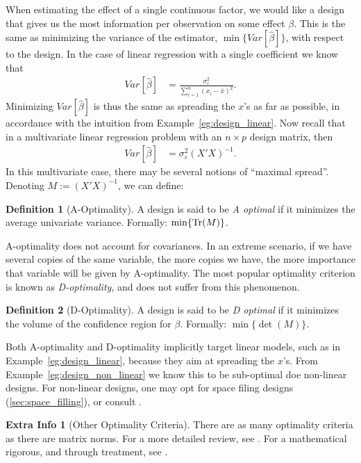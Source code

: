 \documentclass[12pt,a4paper]{report}
\theoremstyle{plain}
\theoremstyle{definition}
\newtheorem{definition}{Definition}
\newtheorem{extra}{Extra Info}
\newcommand{\set}[1]{\{ #1 \}} \newcommand{\setII}[1]{\left\{ #1 \right\}} \newcommand{\rv}[1]{\mathbf{#1}} \newcommand{\x}{\rv x} \newcommand{\y}{\rv y} \newcommand{\U}{\rv u} \newcommand{\T}{\rv t} \newcommand{\X}{\rv X} \newcommand{\Y}{\rv Y} \newcommand{\expect}[1]{\mathbf{E}\left[ #1 \right]} \newcommand{\expectg}[2]{\mathbf{E}_{\rv{#1}}\left[ \rv{#2} \right]} \newcommand{\expectn}[1]{\mathbb{E}\left[#1\right]} \newcommand{\cov}[1]{\mathbf{Cov} \left[ #1 \right]} \newcommand{\var}[1]{\mathop{Var} \left[ #1 \right]} \newcommand{\covn}[1]{\mathbb{Cov} \left[ #1 \right]} \newcommand{\gauss}[1]{\mathcal{N}\left(#1\right)} \newcommand{\cdf}[2]{F_{#1} (#2)} \newcommand{\survive}[2]{S_{#1} (#2)} \newcommand{\hazard}[2]{h_{#1} (#2)} \newcommand{\cuhazard}[2]{H_{#1} (#2)} \newcommand{\cdfn}[2]{\mathbb{F}_{#1}(#2)} \newcommand{\icdf}[2]{F_\rv{#1}^{-1} (#2)} \newcommand{\icdfn}[2]{\mathbb{F}^{-1}_{#1}(#2)} \newcommand{\pdf}[2]{p_{#1} (#2)} \newcommand{\prob}[1]{P\left( #1 \right)} \newcommand{\dist}{P} \newcommand{\density}{p}
\begin{document}
When estimating the effect of a single continuous factor, we would like a design that gives us the most information per observation on some effect $\beta$. 
This is the same as minimizing the variance of the estimator, $\min \{Var[\hat{\beta}]\}$, with respect to the design.
In the case of linear regression with a single coefficient we know that 
\begin{align}
	Var[\hat{\beta}] &= \frac{\sigma^2_\varepsilon}{\sum_{i=1}^{n}(x_i-\bar{x})^2}.
\end{align}
Minimizing $Var[\hat{\beta}]$ is thus the same as spreading the $x$'s as far as possible, in accordance with the intuition from Example~\ref{eg:design_linear}.
Now recall that in a multivariate linear regression problem with an $n \times p$ design matrix, then 
\begin{align}
	Var[\hat{\beta}] &= \sigma^2_\varepsilon (X'X)^{-1}.
\end{align}
In this multivariate case, there may be several notions of ``maximal spread''. 
Denoting $M:= (X'X)^{-1}$, we can define:
\begin{definition}[A-Optimality]
	A design is said to be \emph{A optimal} if it minimizes the average univariate variance.
	Formally: $\min \set{\Tr(M)}$.
\end{definition}
A-optimality does not account for covariances. 
In an extreme scenario, if we have several copies of the same variable, the more copies we have, the more importance that variable will be given by A-optimality.
The most popular optimality criterion is known as \emph{D-optimality}, and does not suffer from this phenomenon.
\begin{definition}[D-Optimality]
	A design is said to be \emph{D optimal} if it minimizes the volume of the confidence region for $\beta$. 
	Formally: $\min \set{\det(M)}$.
\end{definition}

Both A-optimality and D-optimality implicitly target linear models, such as in Example~\ref{eg:design_linear}, because they aim at spreading the $x$'s. From Example~\ref{eg:design_non_linear} we know this to be sub-optimal doe non-linear designs. 
For non-linear designs, one may opt for space filing designs (\ref{sec:space_filling}), or consult \cite{pukelsheim_optimal_1993}. 



\begin{extra}[Other Optimality Criteria]
There are as many optimality criteria as there are matrix norms. For a more detailed review, see \cite{wikipedia_optimal_2015}.
For a mathematical rigorous, and through treatment, see \cite{pukelsheim_optimal_1993}.
\end{extra}
\end{document}
